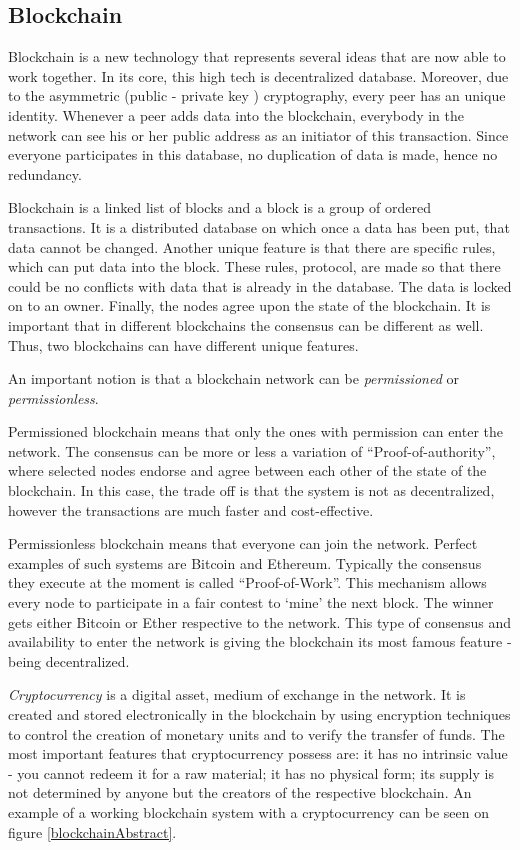 \documentclass[a4paper,11pt]{report}
\begin{document}
\subsection{Blockchain}
\label{blockchain}
Blockchain is a new technology that represents several ideas that are now able to work together. In its core, this high tech is decentralized database. Moreover, due to the asymmetric (public - private key ) cryptography, every peer has an unique identity. Whenever a peer adds data into the blockchain, everybody in the network can see his or her public address as an initiator of this transaction. Since everyone participates in this database, no duplication of data is made, hence no redundancy. 
 
	Blockchain is a linked list of blocks and a block is a group of ordered transactions. It is a distributed database on which once a data has been put, that data cannot be changed. Another unique feature is that there are specific rules, which can put data into the block. These rules, protocol, are made so that there could be no conflicts with data that is already in the database. The data is locked on to an owner. Finally, the nodes agree upon the state of the blockchain.\cite{whatIsBlockchain} It is important that in different blockchains the consensus can be different as well. Thus, two blockchains can have different unique features.
	
	An important notion is that a blockchain network can be \textit{permissioned} or \textit{permissionless}.
	 
Permissioned blockchain means that only the ones with permission can enter the network. The consensus can be more or less a variation of “Proof-of-authority”, where selected nodes endorse and agree between each other of the state of the blockchain. In this case, the trade off is that the system is not as decentralized, however the transactions are much faster and cost-effective.

	Permissionless blockchain means that everyone can join the network. Perfect examples of such systems are Bitcoin and Ethereum. Typically the consensus they execute at the moment is called “Proof-of-Work”. This mechanism allows every node to participate in a fair contest to ‘mine’ the next block. The winner gets either Bitcoin or Ether respective to the network. This type of consensus and availability to enter the network is giving the blockchain its most famous feature - being decentralized.

	\textit{Cryptocurrency} is a digital asset, medium of exchange in the network. It is created and stored electronically in the blockchain by using encryption techniques to control the creation of monetary units and to verify the transfer of funds. The most important features that cryptocurrency possess are: it has no intrinsic value - you cannot redeem it for a raw material; it has no physical form; its supply is not determined by anyone but the creators of the respective blockchain. \cite{whatIsCryptocurrency}
An example of a working blockchain system with a cryptocurrency can be seen on figure \ref{blockchainAbstract}. 
\end{document}
